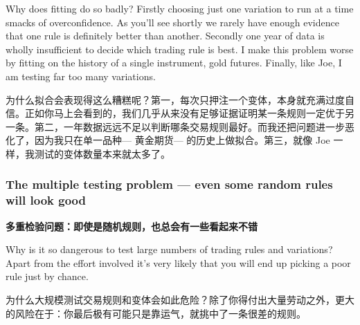 \bipairgap

\begin{englishblock} Why does fitting do so badly? Firstly choosing just one variation to run at a time smacks of overconfidence. As you'll see shortly we rarely have enough evidence that one rule is definitely better than another. Secondly one year of data is wholly insufficient to decide which trading rule is best. I make this problem worse by fitting on the history of a single instrument, gold futures. Finally, like Joe, I am testing far too many variations. \end{englishblock}

\begin{chineseblock}为什么拟合会表现得这么糟糕呢？第一，每次只押注一个变体，本身就充满过度自信。正如你马上会看到的，我们几乎从来没有足够证据证明某一条规则一定优于另一条。第二，一年数据远远不足以判断哪条交易规则最好。而我还把问题进一步恶化了，因为我只在单一品种--- 黄金期货--- 的历史上做拟合。第三，就像 Joe 一样，我测试的变体数量本来就太多了。\end{chineseblock}


\subsubsection*{The multiple testing problem --- even some random rules will look good} \medskip \noindent\textbf{多重检验问题：即使是随机规则，也总会有一些看起来不错} \par \smallskip

\begin{englishblock} Why is it so dangerous to test large numbers of trading rules and variations? Apart from the effort involved it's very likely that you will end up picking a poor rule just by chance. \end{englishblock}

\begin{chineseblock}为什么大规模测试交易规则和变体会如此危险？除了你得付出大量劳动之外，更大的风险在于：你最后极有可能只是靠运气，就挑中了一条很差的规则。\end{chineseblock}

\bipairgap


